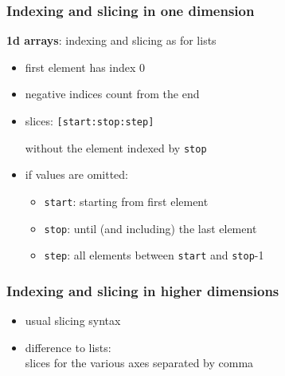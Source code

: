 \begin{frame}[fragile]\frametitle{Indexing and slicing in one dimension}
 \textbf{1d arrays}: indexing and slicing as for lists

 \begin{itemize}
  \item first element has index 0
  \item negative indices count from the end
  \item slices: \lstinline{[start:stop:step]}\\
        \strut\hphantom{slices:\ }  without the element indexed by \lstinline{stop}
  \item if values are omitted:
        \begin{itemize}
         \item \lstinline{start}: starting from first element
         \item \lstinline{stop}: until (and including) the last element
         \item \lstinline{step}: all elements between \lstinline{start} and \lstinline{stop}-1
        \end{itemize}
 \end{itemize}

\end{frame}

\begin{frame}[fragile]\frametitle{Indexing and slicing in higher dimensions}
 \begin{itemize}
  \item usual slicing syntax
  \item difference to lists:\\
        slices for the various axes separated by comma
 \end{itemize}

 \begin{center}
 \end{center}
\end{frame}

